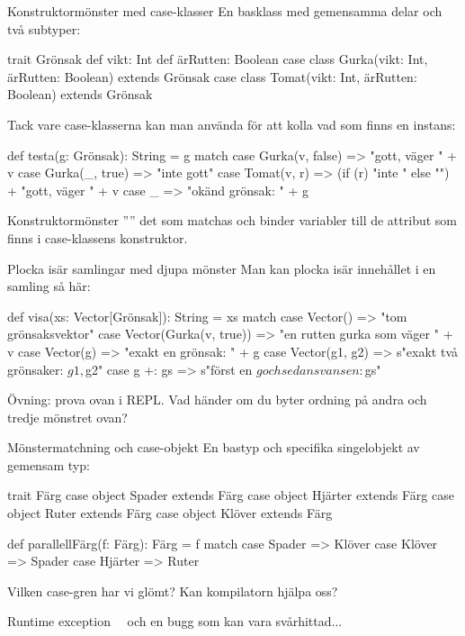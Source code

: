 \begin{Slide}{Konstruktormönster med case-klasser}\SlideFontSmall
En basklass med gemensamma delar och två subtyper:
\begin{Code}
trait Grönsak {
  def vikt: Int
  def ärRutten: Boolean
}
case class Gurka(vikt: Int, ärRutten: Boolean) extends Grönsak
case class Tomat(vikt: Int, ärRutten: Boolean) extends Grönsak
\end{Code}
\pause
Tack vare case-klasserna kan man använda   för att kolla vad som finns  en instans:
\begin{Code}
def testa(g: Grönsak): String = g match {
  case Gurka(v, false) => "gott, väger " + v
  case Gurka(_, true)  => "inte gott"
  case Tomat(v, r)     => (if (r) "inte " else "") + "gott, väger " + v 
  case _ => "okänd grönsak: " + g
}
\end{Code}

Konstruktormönster '''' det som matchas och binder variabler till de attribut som finns i case-klassens konstruktor.
\end{Slide}


\begin{Slide}{Plocka isär samlingar med djupa mönster}
Man kan plocka isär innehållet i en samling så här:
\begin{Code}
def visa(xs: Vector[Grönsak]): String = xs match {
  case Vector()               => "tom grönsaksvektor"
  case Vector(Gurka(v, true)) => "en rutten gurka som väger " + v
  case Vector(g)              => "exakt en grönsak: " + g
  case Vector(g1, g2)         => s"exakt två grönsaker: $g1, $g2"
  case g +: gs                => s"först en $g och sedan svansen: $gs" 
}
\end{Code}
Övning: prova ovan i REPL. Vad händer om du byter ordning på andra och tredje mönstret ovan?
\end{Slide}

\begin{Slide}{Mönstermatchning och case-objekt}
En bastyp och specifika singelobjekt av gemensam typ:
\begin{Code}
trait Färg
case object Spader  extends Färg
case object Hjärter extends Färg
case object Ruter   extends Färg
case object Klöver  extends Färg

def parallellFärg(f: Färg): Färg = f match {
  case Spader  => Klöver
  case Klöver  => Spader
  case Hjärter => Ruter
}
\end{Code}
Vilken case-gren har vi glömt? Kan kompilatorn hjälpa oss?
\pause
{}
Runtime exception \code{:(} ~~och en bugg som kan vara svårhittad...
\end{Slide}


